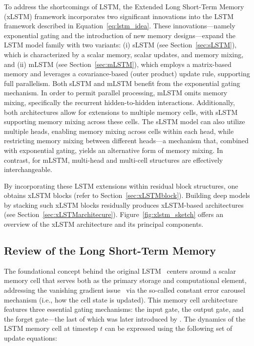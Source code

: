 To address the shortcomings of LSTM, the Extended Long Short-Term Memory (xLSTM) framework incorporates two significant innovations into the LSTM framework described in Equation~\eqref{eq:lstm_idea}. These innovations—namely exponential gating and the introduction of new memory designs—expand the LSTM model family with two variants: (i) sLSTM (see Section~\ref{sec:sLSTM}), which is characterized by a scalar memory, scalar updates, and memory mixing, and (ii) mLSTM (see Section~\ref{sec:mLSTM}), which employs a matrix-based memory and leverages a covariance-based (outer product) update rule, supporting full parallelism. Both sLSTM and mLSTM benefit from the exponential gating mechanism. In order to permit parallel processing, mLSTM omits memory mixing, specifically the recurrent hidden-to-hidden interactions. Additionally, both architectures allow for extensions to multiple memory cells, with sLSTM supporting memory mixing across these cells. The sLSTM model can also utilize multiple heads, enabling memory mixing across cells within each head, while restricting memory mixing between different heads—a mechanism that, combined with exponential gating, yields an alternative form of memory mixing. In contrast, for mLSTM, multi-head and multi-cell structures are effectively interchangeable.

By incorporating these LSTM extensions within residual block structures, one obtains xLSTM blocks (refer to Section~\ref{sec:xLSTMblock}). Building deep models by stacking such xLSTM blocks residually produces xLSTM-based architectures (see Section~\ref{sec:xLSTMarchitecure}). Figure~\ref{fig:xlstm_sketch} offers an overview of the xLSTM architecture and its principal components.

\subsection{Review of the Long Short-Term Memory}
\label{sec:orgLSTM}

The foundational concept behind the original LSTM~\citep{Hochreiter:91,Hochreiter:97nips,Hochreiter:97} centers around a scalar memory cell that serves both as the primary storage and computational element, addressing the vanishing gradient issue~\citep{Hochreiter:91,Hochreiter:00book} via the so-called constant error carousel mechanism (i.e., how the cell state is updated). This memory cell architecture features three essential gating mechanisms: the input gate, the output gate, and the forget gate—the last of which was later introduced by \citet{Gers:00}. The dynamics of the LSTM memory cell at timestep $t$ can be expressed using the following set of update equations:

